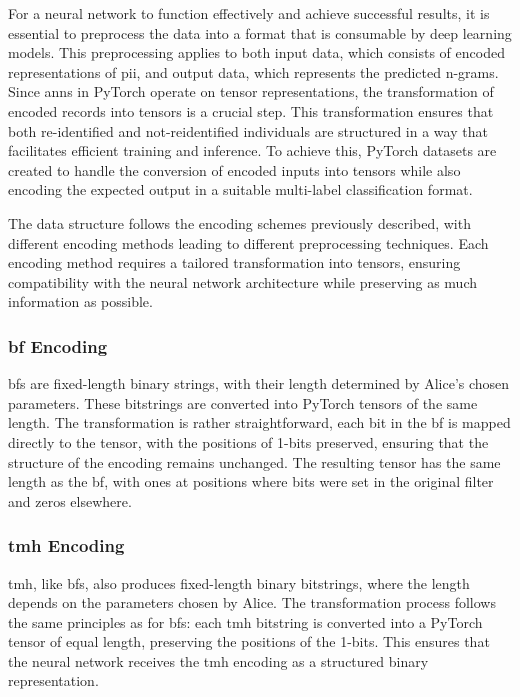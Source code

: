 For a neural network to function effectively and achieve successful results, it is essential to preprocess the data into a format that is consumable by deep learning models.
This preprocessing applies to both input data, which consists of encoded representations of \ac{pii}, and output data, which represents the predicted n-grams.
Since \ac{ann}s in PyTorch operate on tensor representations, the transformation of encoded records into tensors is a crucial step.
This transformation ensures that both re-identified and not-reidentified individuals are structured in a way that facilitates efficient training and inference.
To achieve this, PyTorch datasets are created to handle the conversion of encoded inputs into tensors while also encoding the expected output in a suitable multi-label classification format.

The data structure follows the encoding schemes previously described, with different encoding methods leading to different preprocessing techniques.
Each encoding method requires a tailored transformation into tensors, ensuring compatibility with the neural network architecture while preserving as much information as possible.

\subsubsection{\ac{bf} Encoding}
\ac{bf}s are fixed-length binary strings, with their length determined by Alice’s chosen parameters.
These bitstrings are converted into PyTorch tensors of the same length.
The transformation is rather straightforward, each bit in the \ac{bf} is mapped directly to the tensor, with the positions of 1-bits preserved, ensuring that the structure of the encoding remains unchanged.
The resulting tensor has the same length as the \ac{bf}, with ones at positions where bits were set in the original filter and zeros elsewhere.

\subsubsection{\ac{tmh} Encoding}
\ac{tmh}, like \ac{bf}s, also produces fixed-length binary bitstrings, where the length depends on the parameters chosen by Alice.
The transformation process follows the same principles as for \ac{bf}s: each \ac{tmh} bitstring is converted into a PyTorch tensor of equal length, preserving the positions of the 1-bits.
This ensures that the neural network receives the \ac{tmh} encoding as a structured binary representation.

